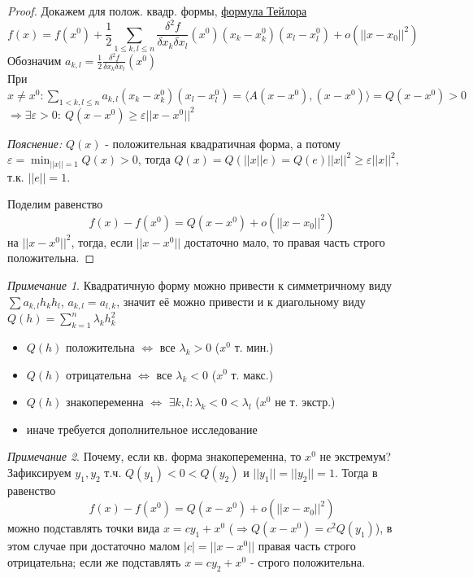 \documentclass{article}
\theoremstyle{indented}
\theoremstyle{definition}
\theoremstyle{remark}
\newtheorem{remark}{Примечание}
\newcommand{\hlink}[2]{\hyperlink{#1}{#2}}
\begin{document}
\begin{proof}
    Докажем для полож. квадр. формы, \hlink{taylor}{формула Тейлора}
    \[
        f(x) = f(x^0) + \frac{1}{2} \sum\limits_{1 \leq k,l \leq n} \frac{\delta^2 f}{\delta x_k \delta x_l} (x^0) (x_k-x_k^0) (x_l-x_l^0) + o(||x-x_0||^2)
    \]
    Обозначим $a_{k,l} = \frac{1}{2} \frac{\delta^2 f}{\delta x_k \delta x_l} (x^0)$\\
    При $x\not=x^0: \sum\limits_{1 < k,l\leq n} a_{k,l} (x_k-x_k^0) (x_l-x_l^0) = \langle A(x-x^0), (x-x^0) \rangle = Q(x-x^0) > 0$
    $\Rightarrow \exists \varepsilon>0: \ Q(x-x^0) \geq \varepsilon ||x-x^0||^2$

    \textit{Пояснение: } $Q(x)$ - положительная квадратичная форма, а потому 
    $\displaystyle \varepsilon = \min_{||x||=1} Q(x) > 0$,
    тогда $Q(x)=Q(||x||e)=Q(e)||x||^2 \geq \varepsilon ||x||^2$, т.к. $||e||=1$.

    Поделим равенство
    \[
        f(x) - f(x^0) = Q(x-x^0) + o(||x-x_0||^2)
    \]
    на $||x-x^0||^2$, тогда, если $||x-x^0||$ достаточно мало, то правая часть строго положительна.
\end{proof}

\begin{remark}
    Квадратичную форму можно привести к симметричному виду $\sum a_{k,l} h_k h_l$,  $a_{k,l}=a_{l,k}$,
    значит её можно привести и к диагольному виду $Q(h) = \sum_{k=1}^n \lambda_k h_k^2$
    \begin{itemize}
        \item $Q(h)$ положительна $\Leftrightarrow$ все $\lambda_k > 0$ ($x^0$ т. мин.)
        \item $Q(h)$ отрицательна $\Leftrightarrow$ все $\lambda_k < 0$ ($x^0$ т. макс.)
        \item $Q(h)$ знакопеременна $\Leftrightarrow$ $\exists k,l: \lambda_k < 0 < \lambda_l$ ($x^0$ не т. экстр.)
        \item иначе требуется дополнительное исследование
    \end{itemize}
\end{remark}

\begin{remark}
    Почему, если кв. форма знакопеременна, то $x^0$ не экстремум? Зафиксируем $y_1, y_2$ т.ч. $Q(y_1) < 0 < Q(y_2)$ и $||y_1||=||y_2||=1$.
    Тогда в равенство
    \[
        f(x) - f(x^0) = Q(x-x^0) + o(||x-x_0||^2)
    \]
    можно подставлять точки вида $x=cy_1+x^0$ ($\Rightarrow Q(x-x^0)=c^2 Q(y_1)$), в этом случае при достаточно малом $|c|=||x-x^0||$
    правая часть строго отрицательна; если же подставлять $x=cy_2+x^0$ - строго положительна.
\end{remark}
\end{document}
